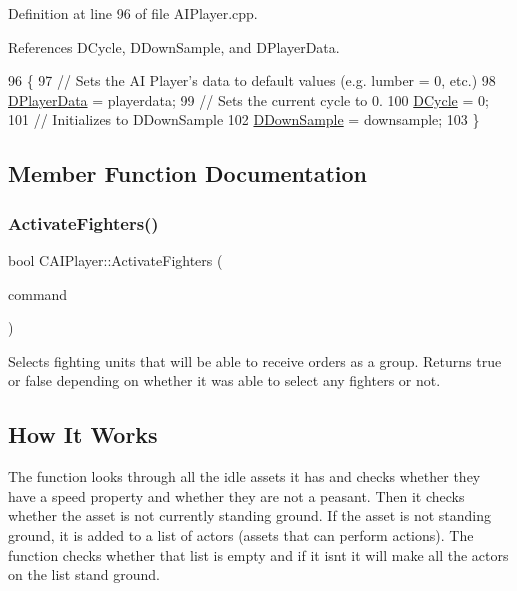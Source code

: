 Definition at line 96 of file A\+I\+Player.\+cpp.



References D\+Cycle, D\+Down\+Sample, and D\+Player\+Data.


\begin{DoxyCode}
96                                                                            \{
97     \textcolor{comment}{// Sets the AI Player's data to default values (e.g. lumber = 0, etc.)}
98     \hyperlink{classCAIPlayer_a83b5113c8f7e80df54940b647c5ee2e6}{DPlayerData} = playerdata;
99     \textcolor{comment}{// Sets the current cycle to 0.}
100     \hyperlink{classCAIPlayer_adf12a7afe7ea86410b18eff47fa95253}{DCycle} = 0;
101     \textcolor{comment}{// Initializes to DDownSample}
102     \hyperlink{classCAIPlayer_a091aed92cb9ad1a789900a6394d2f352}{DDownSample} = downsample;
103 \}
\end{DoxyCode}


\subsection{Member Function Documentation}
\hypertarget{classCAIPlayer_a4216d7e76315234a4fe22fb3a0a89c1d}{}\label{classCAIPlayer_a4216d7e76315234a4fe22fb3a0a89c1d} 
\subsubsection{\texorpdfstring{Activate\+Fighters()}{ActivateFighters()}}
{\footnotesize\ttfamily bool C\+A\+I\+Player\+::\+Activate\+Fighters (\begin{DoxyParamCaption}\item[{\hyperlink{structSPlayerCommandRequest}{S\+Player\+Command\+Request} \&}]{command }\end{DoxyParamCaption})\hspace{0.3cm}{\ttfamily [protected]}}



Selects fighting units that will be able to receive orders as a group. Returns true or false depending on whether it was able to select any fighters or not. 

\hypertarget{classCAIPlayer_afhow_sec}{}\subsection{How It Works}\label{classCAIPlayer_afhow_sec}
The function looks through all the idle assets it has and checks whether they have a speed property and whether they are not a peasant. Then it checks whether the asset is not currently standing ground. If the asset is not standing ground, it is added to a list of actors (assets that can perform actions). The function checks whether that list is empty and if it isn\textquotesingle{}t it will make all the actors on the list stand ground. 

